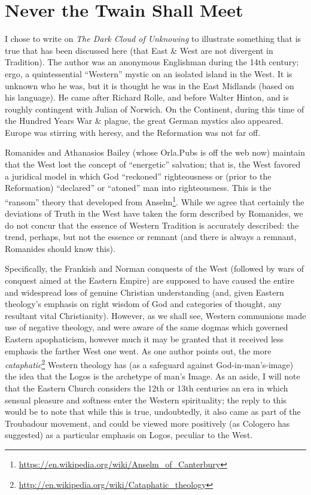 \section{Never the Twain Shall Meet}

I chose to write on \emph{The Dark Cloud of Unknowing} to illustrate something that is true that has been discussed here (that East \& West are not divergent in Tradition). The author was an anonymous Englishman during the 14th century; ergo, a quintessential ``Western'' mystic on an isolated island in the West. It is unknown who he was, but it is thought he was in the East Midlands (based on his language). He came after Richard Rolle, and before Walter Hinton, and is roughly contingent with Julian of Norwich. On the Continent, during this time of the Hundred Years War \& plague, the great German mystics also appeared. Europe was stirring with heresy, and the Reformation was not far off.

Romanides and Athanasios Bailey (whose Orla.Pubs is off the web now) maintain that the West lost the concept of ``energetic'' salvation; that is, the West favored a juridical model in which God ``reckoned'' righteousness or (prior to the Reformation) ``declared'' or ``atoned'' man into righteousness. This is the ``ransom'' theory that developed from Anselm\footnote{\url{https://en.wikipedia.org/wiki/Anselm\_of\_Canterbury}}. While we agree that certainly the deviations of Truth in the West have taken the form described by Romanides, we do not concur that the essence of Western Tradition is accurately described: the trend, perhaps, but not the essence or remnant (and there is always a remnant, Romanides should know this).

Specifically, the Frankish and Norman conquests of the West (followed by wars of conquest aimed at the Eastern Empire) are supposed to have caused the entire and widespread loss of genuine Christian understanding (and, given Eastern theology's emphasis on right wisdom of God and categories of thought, any resultant vital Christianity). However, as we shall see, Western communions made use of negative theology, and were aware of the same dogmas which governed Eastern apophaticism, however much it may be granted that it received less emphasis the farther West one went. As one author points out, the more \emph{cataphatic}\footnote{\url{http://en.wikipedia.org/wiki/Cataphatic\_theology}} Western theology has (as a safeguard against God-in-man's-image) the idea that the Logos is the archetype of man's Image. As an aside, I will note that the Eastern Church considers the 12th or 13th centuries an era in which sensual pleasure and softness enter the Western spirituality; the reply to this would be to note that while this is true, undoubtedly, it also came as part of the Troubadour movement, and could be viewed more positively (as Cologero has suggested) as a particular emphasis on Logos, peculiar to the West.

